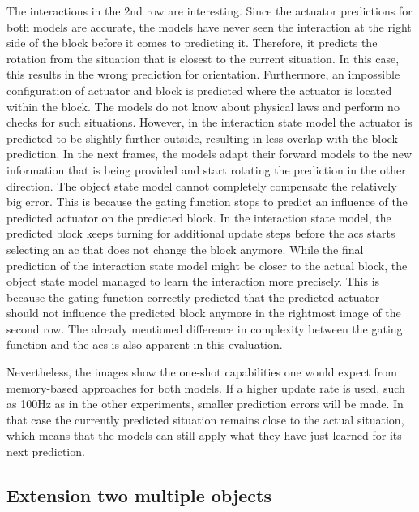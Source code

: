 The interactions in the 2nd row are interesting.
Since the actuator predictions for both models are accurate, the models have never seen the interaction at the right side of the block before it comes to predicting it. Therefore, it predicts the rotation from the situation that is closest to the current situation. In this case, this results in the wrong prediction for orientation.
Furthermore, an impossible configuration of actuator and block is predicted where the actuator is located within the block. 
The models do not know about physical laws and perform no checks for such situations.
However, in the interaction state model the actuator is predicted to be slightly further outside, resulting in less overlap with the block prediction. 
In the next frames, the models adapt their forward models to the new information that is being provided and start rotating the prediction in the other direction. The object state model cannot completely compensate the relatively big error.
This is because the gating function stops to predict an influence of the predicted actuator on the predicted block.
In the interaction state model, the predicted block keeps turning for additional update steps before the \gls{acs} starts selecting an \gls{ac} that does not change the block anymore.
While the final prediction of the interaction state model might be closer to the actual block, the object state model managed to learn the interaction more precisely. This is because the gating function correctly predicted that the predicted actuator should not influence the predicted block anymore in the rightmost image of the second row.
The already mentioned difference in complexity between the gating function and the \gls{acs} is also apparent in this evaluation.

Nevertheless, the images show the one-shot capabilities one would expect from memory-based approaches for both models. If a higher update rate is used, such as 100Hz as in the other experiments, smaller prediction errors will be made. In that case the currently predicted situation remains close to the actual situation, which means that the models can still apply what they have just learned for its next prediction.


\subsection{Extension two multiple objects}

